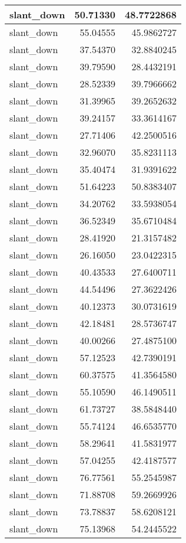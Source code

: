 \documentclass[
]{book}
\theoremstyle{definition}
\theoremstyle{definition}
\theoremstyle{definition}
\theoremstyle{definition}
\theoremstyle{remark}
\begin{document}
\begin{tabular}{l|r|r}
\hline
slant\_down & 50.71330 & 48.7722868\\
\hline
slant\_down & 55.04555 & 45.9862727\\
\hline
slant\_down & 37.54370 & 32.8840245\\
\hline
slant\_down & 39.79590 & 28.4432191\\
\hline
slant\_down & 28.52339 & 39.7966662\\
\hline
slant\_down & 31.39965 & 39.2652632\\
\hline
slant\_down & 39.24157 & 33.3614167\\
\hline
slant\_down & 27.71406 & 42.2500516\\
\hline
slant\_down & 32.96070 & 35.8231113\\
\hline
slant\_down & 35.40474 & 31.9391622\\
\hline
slant\_down & 51.64223 & 50.8383407\\
\hline
slant\_down & 34.20762 & 33.5938054\\
\hline
slant\_down & 36.52349 & 35.6710484\\
\hline
slant\_down & 28.41920 & 21.3157482\\
\hline
slant\_down & 26.16050 & 23.0422315\\
\hline
slant\_down & 40.43533 & 27.6400711\\
\hline
slant\_down & 44.54496 & 27.3622426\\
\hline
slant\_down & 40.12373 & 30.0731619\\
\hline
slant\_down & 42.18481 & 28.5736747\\
\hline
slant\_down & 40.00266 & 27.4875100\\
\hline
slant\_down & 57.12523 & 42.7390191\\
\hline
slant\_down & 60.37575 & 41.3564580\\
\hline
slant\_down & 55.10590 & 46.1490511\\
\hline
slant\_down & 61.73727 & 38.5848440\\
\hline
slant\_down & 55.74124 & 46.6535770\\
\hline
slant\_down & 58.29641 & 41.5831977\\
\hline
slant\_down & 57.04255 & 42.4187577\\
\hline
slant\_down & 76.77561 & 55.2545987\\
\hline
slant\_down & 71.88708 & 59.2669926\\
\hline
slant\_down & 73.78837 & 58.6208121\\
\hline
slant\_down & 75.13968 & 54.2445522\\

\end{tabular}
\end{document}
